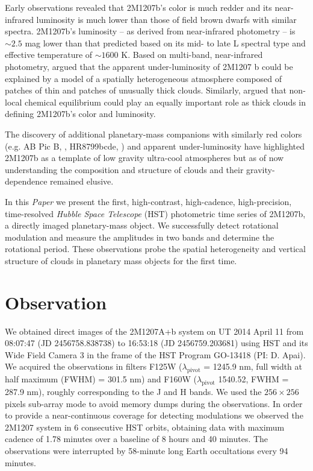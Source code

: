 \documentclass[apj]{emulateapj}
\newcommand{\revise}[1]{\textbf{{\color{cyan}{#1}}}}
\renewcommand{\revise}{}
\begin{document}
Early observations revealed that 2M1207b's color is much redder and
its near-infrared luminosity is much lower than those of field brown
dwarfs with similar spectra\citep[e.g][]{Mohanty2007, Skemer2011,
  Barman2011b}. 2M1207b's luminosity -- as derived from near-infrared
photometry -- is $\sim2.5$ mag lower than that predicted based on its
mid- to late L spectral type and effective temperature of $\sim 1600$
 K\citep{Patience2010}.  Based on multi-band, near-infrared photometry,
\citet{Skemer2011} argued that the apparent under-luminosity of 2M1207
b could be explained by a model of a spatially heterogeneous atmosphere
composed of patches of thin and patches of unusually thick clouds.
Similarly, \cite{Barman2011b} argued that non-local chemical
equilibrium could play an equally important role as thick clouds in
defining 2M1207b's color and luminosity.

The discovery of additional planetary-mass companions with similarly
red colors \revise{(e.g. AB Pic B, \citealt[][]{Chauvin2005b}, HR8799bcde,
  \citealt[][]{Marois2008a,Marois2010})} and apparent under-luminosity have
highlighted 2M1207b as a template of low gravity ultra-cool
atmospheres but as of now understanding the composition and structure
of clouds and their gravity-dependence remained elusive.


In this {\em Paper} we present the first, high-contrast, high-cadence,
high-precision, time-resolved {\em Hubble Space Telescope} (HST)
photometric time series of 2M1207b, a directly imaged planetary-mass
object. We successfully detect rotational modulation and measure the
amplitudes in two bands and determine the rotational period. These
observations probe the spatial heterogeneity and vertical structure of
clouds in planetary mass objects for the first time.

\section{Observation}



We obtained direct images of the 2M1207A+b system on UT 2014 April 11
from 08:07:47 \revise{(JD 2456758.838738)} to 16:53:18 \revise{(JD
  2456759.203681)} using HST and its Wide Field Camera 3 \citep[WFC3,
pixel scale=$0.130$mas/pixel,
][]{Mackenty2008} in the frame of the HST Program GO-13418 (PI:
D. Apai). We acquired the observations in filters F125W
($\lambda_{\mathrm{pivot}}$
= 1245.9 nm, full width at half maximum (FWHM) = 301.5 nm) and F160W
($\lambda_{\mathrm{pivot}}$
1540.52, FWHM = 287.9 nm), roughly corresponding to the J and H
bands. We used the $256\times256$
pixels sub-array mode to avoid memory dumps during the observations.
In order to provide a near-continuous coverage for detecting
modulations we observed the 2M1207 system in 6 consecutive HST orbits,
obtaining data with \revise{maximum} cadence of 1.78 minutes over a
baseline of 8 hours and 40 minutes. The observations were interrupted
by 58-minute long Earth occultations every 94 minutes.
\end{document}
